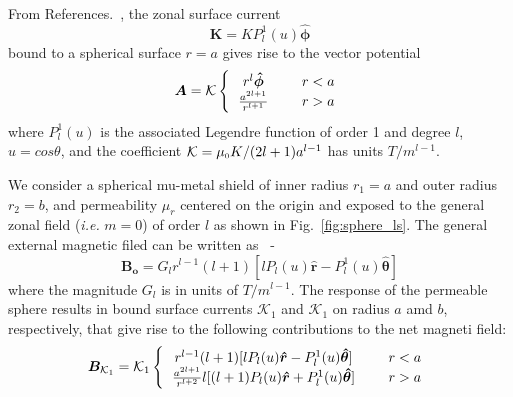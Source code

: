 From References.~\cite{CB1, smythe}, the zonal surface current
\begin{equation}\label{i}
\bm{K}=KP_l^1(u)\bm{\hat{\phi}}
\end{equation}
bound to a spherical surface $r=a$ gives rise to the vector potential
\begin{equation}\label{a}
\bm A =\mathcal{K} 
\left \{
  \begin{tabular}{ccc}
  $r^l \bm{\hat{\phi}}$ &  & $r< a$  \\
  $\frac{a^{2l+1}}{r^{l+1}}$ &  & $r> a$ 
  \end{tabular}
 \right.
\end{equation}
where $P_l^1(u)$ is the associated Legendre function of order 1 and degree $l$,  $u=cos\theta$, and the coefficient $\mathcal{K}={\mu_{\scriptscriptstyle 0} K}/{(2l+1)a^{l-1}}$ has units $T/m^{l-1}$.


We consider a spherical mu-metal shield of inner radius $r_1=a$ and outer radius $r_2=b$, and permeability $\mu_r$ centered on the origin and exposed to the general zonal field (\textit{i.e.}
$m=0$)
of order $l$ %
as shown in Fig.~\ref{fig:sphere_ls}. The general external magnetic filed can be written as~\cite{CB1, smythe} -
\begin{equation}\label{bo}
\bm{B_o} = G_l r^{l-1} (l+1)[l P_l(u) \bm{\hat{r}} -  P_l^1(u)  \bm{\hat{\theta}} ] 
\end{equation}
where the magnitude $G_l$ is in units of $T/m^{l-1}$.  
The response of the permeable sphere  results in bound surface currents $\mathcal{K}_1$ and $\mathcal{K}_1$ on radius $a$ amd $b$, respectively, that give rise to the following contributions to the net magneti field:
\begin{equation}\label{r=R}
\bm B_{\mathcal{K}_1} =
\mathcal{K}_1
\left \{
  \begin{tabular}{ccc}
  $r^{l-1}(l+1)[l P_l(u)\bm{\hat{r}} -  P_l^1(u) \bm{\hat{\theta}} ]$ &  & $r<a$  \\
  $\frac{a^{2l+1}}{r^{l+2}}
l[(l+1) P_l(u) \bm{\hat{r}} +  P_l^1(u)  \bm{\hat{\theta}} ]$ &  & $r>a$  
  \end{tabular}
\right. 
\end{equation}


